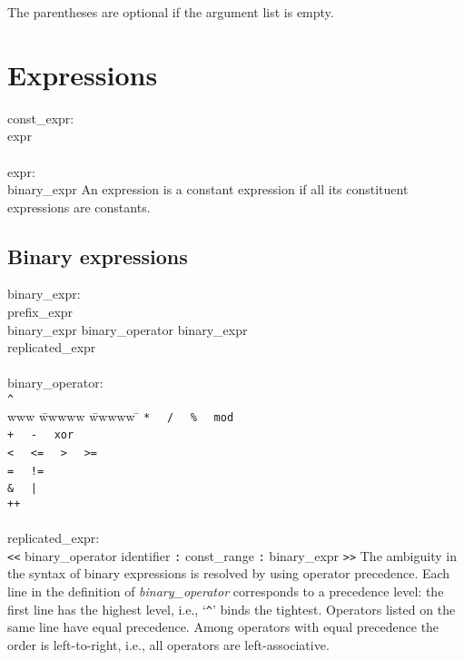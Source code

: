 The parentheses are optional if the argument list is empty.



\section{Expressions}\label{sec:expr}

\grammarstart
const\_expr: \\
      \>expr \\
 \\
expr: \\
      \>binary\_expr
\grammarend
An expression is a constant expression if all its constituent expressions
are constants.

\subsection{Binary expressions}\label{sec:binary}

\grammarstart
binary\_expr: \\
       \>prefix\_expr \\
\orbox \>binary\_expr binary\_operator binary\_expr \\
\orbox \>replicated\_expr \\
 \\
binary\_operator: \\
       \>\verb|^| \\
       \> www \= wwwww \= wwwww \= \kill
\orbox \> {\tt{}*} \> \orbox \ \ {\tt{}/} \> \orbox \ \ {\tt{}\%} \> \orbox \ \ {\tt{}mod} \\
\orbox \> {\tt{}+} \> \orbox \ \ {\tt{}-} \> \orbox \ \ {\tt{}xor} \\
\orbox \> {\tt{}<} \> \orbox \ \ {\tt{}<=} \> \orbox \ \ {\tt{}>} \> \orbox \ \ {\tt{}>=} \\
\orbox \> {\tt{}=} \> \orbox \ \ {\tt{}!=}  \\
\orbox \> {\tt{}\&} \> \orbox \ \ \verb'|' \\
\orbox \> {\tt{}++} \\
 \\
replicated\_expr: \\
        {\tt{}<<} binary\_operator identifier {\tt{}:} const\_range {\tt{}:} binary\_expr {\tt{}>>}
\grammarend
The ambiguity in the syntax of binary expressions is resolved by
using operator precedence. Each line in the definition of
{\it{}binary\_operator} corresponds to a precedence level: the first
line has the highest level, i.e., `\verb|^|' binds the tightest. Operators
listed on the same line have equal precedence. Among operators with
equal precedence the order is left-to-right, i.e., all operators
are left-associative.

